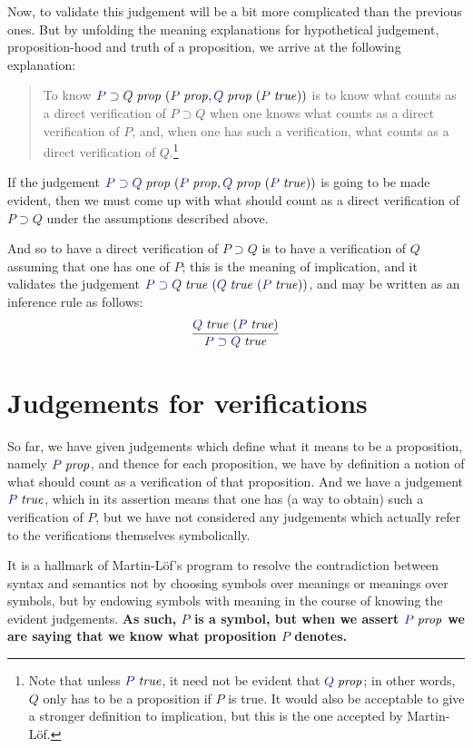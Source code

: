 \documentclass[main.tex]{subfiles}
\begin{document}
Now, to validate this judgement will be a bit more complicated than the
previous ones. But by unfolding the meaning explanations for hypothetical
judgement, proposition-hood and truth of a proposition, we arrive at the
following explanation:
\begin{quote}
  To know $\hyp{\isprop{P\supset Q}}{\isprop{P},\hyp{\isprop{Q}}{\istrue{P}}}$
  is to know what counts as a direct verification of $P\supset Q$ when one
  knows what counts as a direct verification of $P$, and, when one has such a
  verification, what counts as a direct verification of $Q$.\footnote{Note that
  unless $\istrue{P}$, it need not be evident that $\isprop{Q}$; in other
  words, $Q$ only has to be a proposition if $P$ is true. It would also be
  acceptable to give a stronger definition to implication, but this is the one
  accepted by Martin-L\"of.}
\end{quote}


If the judgement $\hyp{\isprop{P\supset
Q}}{\isprop{P},\hyp{\isprop{Q}}{\istrue{P}}}$ is going to be made evident, then
we must come up with what should count as a direct verification of $P\supset Q$
under the assumptions described above.

And so to have a direct verification of $P\supset Q$ is to have a
verification of $Q$ assuming that one has one of $P$; this is the
meaning of implication, and it validates the judgement
$\hyp{\istrue{P\supset Q}}{\hyp{\istrue{Q}}{\istrue{P}}}$, and may be
written as an inference rule as follows:
\[
  \infer{
    \istrue{P\supset Q}
  }{
    \hyp{\istrue{Q}}{\istrue{P}}
  }
\]

\section{Judgements for verifications}

So far, we have given judgements which define what it means to be a
proposition, namely $\isprop{P}$, and thence for each proposition, we
have by definition a notion of what should count as a verification of
that proposition. And we have a judgement $\istrue{P}$, which in its
assertion means that one has (a way to obtain) such a verification of
$P$, but we have not considered any judgements which actually refer to
the verifications themselves symbolically.

It is a hallmark of Martin-L\"of's program to resolve the
contradiction between syntax and semantics not by choosing symbols
over meanings or meanings over symbols, but by endowing symbols with
meaning in the course of knowing the evident judgements. \textbf{As
such, $P$ is a symbol, but when we assert $\isprop{P}$ we are saying
that we know what proposition $P$ denotes.}
\end{document}
